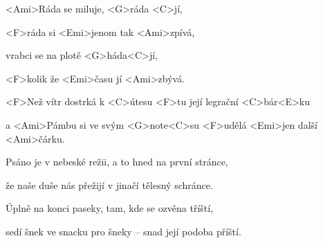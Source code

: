 

\zr
<Ami>Ráda se miluje, <G>ráda <C>jí,

<F>ráda si <Emi>jenom tak <Ami>zpívá,

vrabci se na plotě <G>háda<C>jí,

<F>kolik že <Emi>času jí <Ami>zbývá.
\kr

\zs
<F>Než vítr dostrká k <C>útesu <F>tu její legrační 
<C>bár<E>ku

a <Ami>Pámbu si ve svým <G>note<C>su <F>udělá <Emi>jen další <Ami>čárku.
\ks

\zr \kr

\zs
Psáno je v nebeské režii, a to hned na první stránce,

že naše duše nás přežijí v jinačí tělesný schránce.
\ks

\zr \kr

\zs
Úplně na konci paseky, tam, kde se ozvěna tříští,

sedí šnek ve snacku pro šneky -- snad její podoba příští. \ks

\zr \kr

\kp





